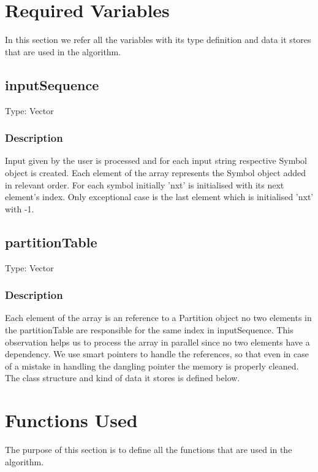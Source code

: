 \documentclass{article}
\begin{document}
\begin{flushleft}
\newpage

\section{Required Variables}

In this section we refer all the variables with its type definition and 
data it stores that are used in the algorithm.

\subsection{inputSequence}
Type: Vector

\subsubsection*{Description}
Input given by the user is processed and for each input string respective Symbol object is created. Each element of the array represents the Symbol object added in relevant order. For each symbol initially 'nxt' is initialised with its next element's index. Only exceptional case is the last element which is initialised 'nxt' with -1.

\subsection{partitionTable}
Type:  Vector

\subsubsection*{Description}
Each element of the array is an reference to a Partition object no two elements in the partitionTable are responsible for the same index in inputSequence. This 
observation helps us to process the array in parallel since no two elements have a dependency. 
We use smart pointers to handle the references, so that even in case of a mistake 
in handling the dangling pointer the memory is properly cleaned. The class structure and kind of data it stores is defined below. 


\newpage

\section{Functions Used}

The purpose of this section is to define all the functions that are used in the algorithm.


\end{flushleft}
\end{document}

